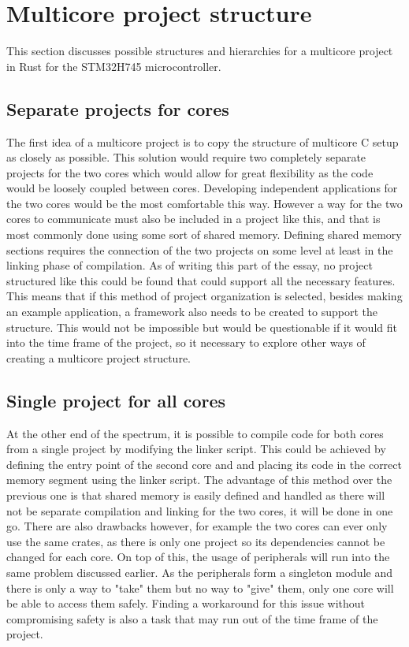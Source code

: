 \section{Multicore project structure}

This section discusses possible structures and hierarchies for a multicore project in Rust for the STM32H745 microcontroller.

\subsection{Separate projects for cores}

The first idea of a multicore project is to copy the structure of multicore C setup as closely as possible. This solution would require two completely separate projects for the two cores which would allow for great flexibility as the code would be loosely coupled between cores. Developing independent applications for the two cores would be the most comfortable this way. However a way for the two cores to communicate must also be included in a project like this, and that is most commonly done using some sort of shared memory. Defining shared memory sections requires the connection of the two projects on some level at least in the linking phase of compilation. As of writing this part of the essay, no project structured like this could be found that could support all the necessary features. This means that if this method of project organization is selected, besides making an example application, a framework also needs to be created to support the structure. This would not be impossible but would be questionable if it would fit into the time frame of the project, so it necessary to explore other ways of creating a multicore project structure.

\subsection{Single project for all cores}

At the other end of the spectrum, it is possible to compile code for both cores from a single project by modifying the linker script. This could be achieved by defining the entry point of the second core and and placing its code in the correct memory segment using the  linker script. The advantage of this method over the previous one is that shared memory is easily defined and handled as there will not be separate compilation and linking for the two cores, it will be done in one go. There are also drawbacks however, for example the two cores can ever only use the same crates, as there is only one project so its dependencies cannot be changed for each core. On top of this, the usage of peripherals will run into the same problem discussed earlier. As the peripherals form a singleton module and there is only a way to "take" them but no way to "give" them, only one core will be able to access them safely. Finding a workaround for this issue without compromising safety is also a task that may run out of the time frame of the project.

